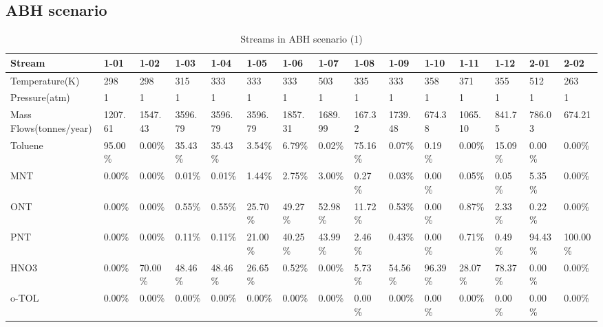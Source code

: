 \begin{landscape}
\newpage
\subsection{ABH scenario}



\begin{table}[H]
\centering
\caption{Streams in ABH scenario (1)}
\label{ABAFST1}
\begin{tabular}{|l|l|l|l|l|l|l|l|l|l|l|l|l|l|l|}
\hline
\textbf{Stream}         & 1-01    & 1-02    & 1-03    & 1-04    & 1-05    & 1-06    & 1-07    & 1-08    & 1-09    & 1-10    & 1-11    & 1-12    & 2-01    & 2-02     \\ \hline
Temperature(K)          & 298     & 298     & 315     & 333     & 333     & 333     & 503     & 335     & 333     & 358     & 371     & 355     & 512     & 263      \\ \hline
Pressure(atm)           & 1       & 1       & 1       & 1       & 1       & 1       & 1       & 1       & 1       & 1       & 1       & 1       & 1       & 1        \\ \hline
Mass Flows(tonnes/year) & 1207.61 & 1547.43 & 3596.79 & 3596.79 & 3596.79 & 1857.31 & 1689.99 & 167.32  & 1739.48 & 674.38  & 1065.10 & 841.75  & 786.03  & 674.21   \\ \hline
Toluene                 & 95.00\% & 0.00\%  & 35.43\% & 35.43\% & 3.54\%  & 6.79\%  & 0.02\%  & 75.16\% & 0.07\%  & 0.19\%  & 0.00\%  & 15.09\% & 0.00\%  & 0.00\%   \\ \hline
MNT                     & 0.00\%  & 0.00\%  & 0.01\%  & 0.01\%  & 1.44\%  & 2.75\%  & 3.00\%  & 0.27\%  & 0.03\%  & 0.00\%  & 0.05\%  & 0.05\%  & 5.35\%  & 0.00\%   \\ \hline
ONT                     & 0.00\%  & 0.00\%  & 0.55\%  & 0.55\%  & 25.70\% & 49.27\% & 52.98\% & 11.72\% & 0.53\%  & 0.00\%  & 0.87\%  & 2.33\%  & 0.22\%  & 0.00\%   \\ \hline
PNT                     & 0.00\%  & 0.00\%  & 0.11\%  & 0.11\%  & 21.00\% & 40.25\% & 43.99\% & 2.46\%  & 0.43\%  & 0.00\%  & 0.71\%  & 0.49\%  & 94.43\% & 100.00\% \\ \hline
HNO3                    & 0.00\%  & 70.00\% & 48.46\% & 48.46\% & 26.65\% & 0.52\%  & 0.00\%  & 5.73\%  & 54.56\% & 96.39\% & 28.07\% & 78.37\% & 0.00\%  & 0.00\%   \\ \hline
o-TOL                   & 0.00\%  & 0.00\%  & 0.00\%  & 0.00\%  & 0.00\%  & 0.00\%  & 0.00\%  & 0.00\%  & 0.00\%  & 0.00\%  & 0.00\%  & 0.00\%  & 0.00\%  & 0.00\%   \\ \hline

\end{tabular}
\end{table}
\end{landscape}
